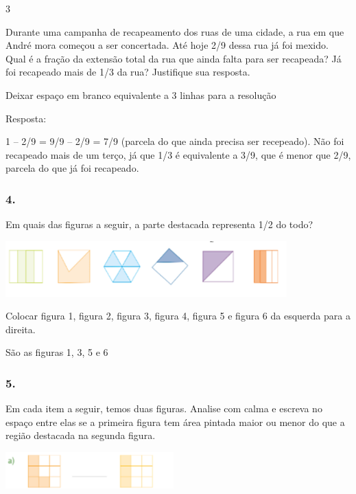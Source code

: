 \begin{mdframed}[linewidth=2pt,linecolor=salmao,roundcorner=2pt]
\begin{escolha}
{{\num{3}

Durante uma campanha de recapeamento dos ruas de uma cidade, a rua em
que André mora começou a ser concertada. Até hoje 2/9 dessa rua já foi mexido.
Qual é a fração da extensão total da rua que ainda falta para ser
recapeada? Já foi recapeado mais de 1/3 da rua? Justifique sua resposta.

Deixar espaço em branco equivalente a 3 linhas para a resolução

Resposta:

1 -- 2/9 = 9/9 -- 2/9 = 7/9 (parcela do que ainda precisa ser recepeado).
Não foi recapeado mais de um terço, já que 1/3 é equivalente a 3/9, que é menor que 2/9, parcela do que já foi recapeado.

\subsubsection{4. }

Em quais das figuras a seguir, a parte destacada representa 1/2 do todo?

\includegraphics[width=4.27537in,height=0.84174in]{media/image107.png}

Colocar figura 1, figura 2, figura 3, figura 4, figura 5 e figura 6 da
esquerda para a direita.

São as figuras 1, 3, 5 e 6

\subsubsection{5. }

Em cada item a seguir, temos duas figuras. Analise com calma e escreva no espaço
entre elas se a primeira figura tem área pintada maior ou menor do que a
região destacada na segunda figura.


\begin{escolha}
\item
\end{escolha}

\includegraphics[width=2.55022in,height=0.55005in]{media/image108.png}

}}
\end{escolha}
\end{mdframed}
